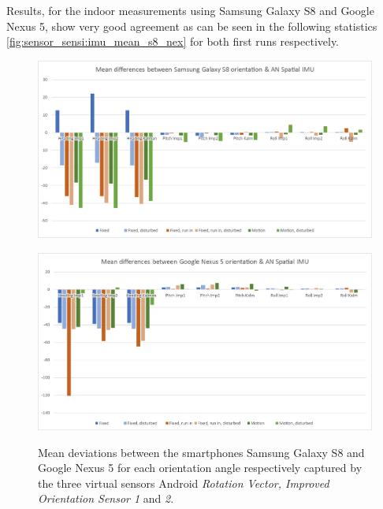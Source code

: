 \documentclass[review]{elsarticle}
\begin{document}
Results, for the indoor measurements using Samsung Galaxy S8 and Google Nexus 5, show very good agreement as can be seen in the following statistics \ref{fig:sensor_sensi:imu_mean_s8_nex} for both first runs respectively.

\begin{figure}[htbp!]
\begin{center}
	 	\begin{minipage}{\columnwidth}
	 		\centering
			\subfigure
			{\includegraphics[keepaspectratio, width=1\columnwidth]{graphics/sensor_mean_imu_s8}\label{fig:sensor_sensi:imu_mean_s8_nex5:s8}}
	 	\end{minipage} 
	 	\begin{minipage}{\columnwidth}
	 		\centering
			\subfigure 
			{\includegraphics[keepaspectratio, width=1\columnwidth]{graphics/sensor_mean_imu_nexus5}\label{fig:sensor_sensi:imu_mean_s8_nex5:nex5}}
	 	\end{minipage}
		
		\caption{Mean deviations between the smartphones Samsung Galaxy S8 and Google Nexus 5 for each orientation angle respectively captured by the three virtual sensors Android \textit{Rotation Vector, Improved Orientation Sensor 1} and \textit{2}. }
		\label{fig:sensor_sensi:imu_mean_s8_nex5}
\end{center}
\end{figure}
\end{document}
